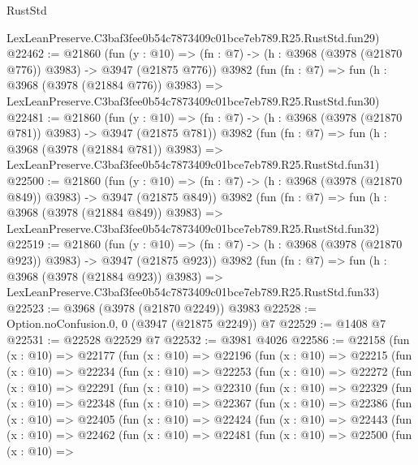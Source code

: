 \begin{lexlean}{RustStd}
\begin{coremodule}
    LexLeanPreserve.C3baf3fee0b54c7873409c01bce7eb789.R25.RustStd.fun29)
@22462 := @21860
    (fun (y : @10) => (fn : @7) -> (h : @3968 (@3978 (@21870 @776)) @3983) -> @3947 (@21875 @776))
    @3982
    (fun (fn : @7) =>
    fun (h : @3968 (@3978 (@21884 @776)) @3983) =>
    LexLeanPreserve.C3baf3fee0b54c7873409c01bce7eb789.R25.RustStd.fun30)
@22481 := @21860
    (fun (y : @10) => (fn : @7) -> (h : @3968 (@3978 (@21870 @781)) @3983) -> @3947 (@21875 @781))
    @3982
    (fun (fn : @7) =>
    fun (h : @3968 (@3978 (@21884 @781)) @3983) =>
    LexLeanPreserve.C3baf3fee0b54c7873409c01bce7eb789.R25.RustStd.fun31)
@22500 := @21860
    (fun (y : @10) => (fn : @7) -> (h : @3968 (@3978 (@21870 @849)) @3983) -> @3947 (@21875 @849))
    @3982
    (fun (fn : @7) =>
    fun (h : @3968 (@3978 (@21884 @849)) @3983) =>
    LexLeanPreserve.C3baf3fee0b54c7873409c01bce7eb789.R25.RustStd.fun32)
@22519 := @21860
    (fun (y : @10) => (fn : @7) -> (h : @3968 (@3978 (@21870 @923)) @3983) -> @3947 (@21875 @923))
    @3982
    (fun (fn : @7) =>
    fun (h : @3968 (@3978 (@21884 @923)) @3983) =>
    LexLeanPreserve.C3baf3fee0b54c7873409c01bce7eb789.R25.RustStd.fun33)
@22523 := @3968 (@3978 (@21870 @2249)) @3983
@22528 := Option.noConfusion.{0, 0} (@3947 (@21875 @2249)) @7
@22529 := @1408 @7
@22531 := @22528 @22529 @7
@22532 := @3981 @4026
@22586 := @22158
    (fun (x : @10) =>
    @22177
      (fun (x : @10) =>
      @22196
        (fun (x : @10) =>
        @22215
          (fun (x : @10) =>
          @22234
            (fun (x : @10) =>
            @22253
              (fun (x : @10) =>
              @22272
                (fun (x : @10) =>
                @22291
                  (fun (x : @10) =>
                  @22310
                    (fun (x : @10) =>
                    @22329
                      (fun (x : @10) =>
                      @22348
                        (fun (x : @10) =>
                        @22367
                          (fun (x : @10) =>
                          @22386
                            (fun (x : @10) =>
                            @22405
                              (fun (x : @10) =>
                              @22424
                                (fun (x : @10) =>
                                @22443
                                  (fun (x : @10) =>
                                  @22462
                                    (fun (x : @10) =>
                                    @22481
                                      (fun (x : @10) =>
                                      @22500
                                        (fun (x : @10) =>

\end{coremodule}
\end{lexlean}
